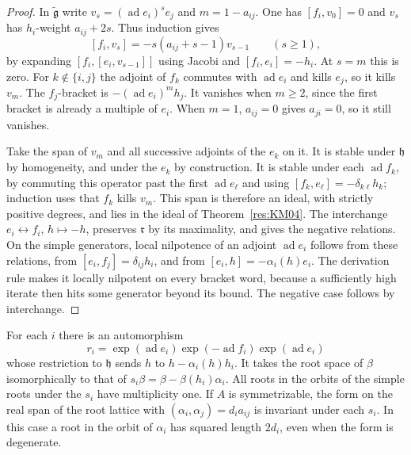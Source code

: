 \begin{proof}
In \(\widetilde{\mathfrak g}\) write
\(v_s=(\operatorname{ad}e_i)^s e_j\) and \(m=1-a_{ij}\).
One has \([f_i,v_0]=0\) and \(v_s\) has \(h_i\)-weight
\(a_{ij}+2s\). Thus induction gives
\[
 [f_i,v_s]=-s(a_{ij}+s-1)v_{s-1}\qquad(s\ge1),
\]
by expanding \([f_i,[e_i,v_{s-1}]]\) using Jacobi and
\([f_i,e_i]=-h_i\). At \(s=m\) this is zero.
For \(k\notin\{i,j\}\) the adjoint of \(f_k\) commutes with
\(\operatorname{ad}e_i\) and kills \(e_j\), so it kills \(v_m\).
The \(f_j\)-bracket is \(-(\operatorname{ad}e_i)^m h_j\).
It vanishes when \(m\ge2\), since the first bracket is already a
multiple of \(e_i\). When \(m=1\), \(a_{ij}=0\) gives
\(a_{ji}=0\), so it still vanishes.

Take the span of \(v_m\) and all successive adjoints of the
\(e_k\) on it. It is stable under \(\mathfrak h\) by homogeneity,
and under the \(e_k\) by construction. It is stable under each
\(\operatorname{ad}f_k\), by commuting this operator past the
first \(\operatorname{ad}e_\ell\) and using
\([f_k,e_\ell]=-\delta_{k\ell}h_k\); induction uses that \(f_k\)
kills \(v_m\). This span is therefore an ideal, with strictly
positive degrees, and lies in the ideal of
Theorem~\ref{res:KM04}. The interchange \(e_i\leftrightarrow f_i\),
\(h\mapsto-h\), preserves \(\mathfrak r\) by its maximality, and
gives the negative relations. On the simple generators, local
nilpotence of an adjoint \(\operatorname{ad}e_i\) follows from
these relations, from \([e_i,f_j]=\delta_{ij}h_i\), and from
\([e_i,h]=-\alpha_i(h)e_i\). The derivation rule makes it
locally nilpotent on every bracket word, because a sufficiently
high iterate then hits some generator beyond its bound.
The negative case follows by interchange.
\end{proof}

\begin{proposition}
\label{res:KM06}
For each \(i\) there is an automorphism
\[
 r_i=\exp(\operatorname{ad}e_i)
      \exp(-\operatorname{ad}f_i)\exp(\operatorname{ad}e_i)
\]
whose restriction to \(\mathfrak h\) sends
\(h\) to \(h-\alpha_i(h)h_i\).
It takes the root space of \(\beta\) isomorphically to that
of \(s_i\beta=\beta-\beta(h_i)\alpha_i\). All roots in the
orbits of the simple roots under the \(s_i\) have multiplicity one.
If \(A\) is symmetrizable, the form on the real span of the
root lattice with
\((\alpha_i,\alpha_j)=d_i a_{ij}\) is invariant under each
\(s_i\). In this case a root in the orbit of \(\alpha_i\)
has squared length \(2d_i\), even when the form is degenerate.
\end{proposition}

